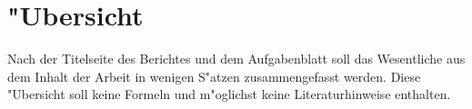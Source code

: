 \newpage
\chapter*{"Ubersicht}
Nach der Titelseite des Berichtes und dem Aufgabenblatt soll das Wesentliche aus dem Inhalt der Arbeit in
wenigen S"atzen zusammengefasst werden. Diese "Ubersicht soll keine Formeln und m"oglichst keine Literaturhinweise enthalten.

